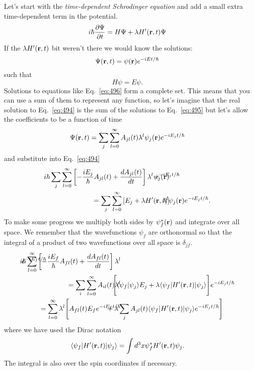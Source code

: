 Let's start with the {\em time-dependent Schrodinger equation} and add
a small extra time-dependent term in the potential.
\begin{equation}
i\hbar \frac{\partial {\Psi}}{\partial {t}} = H \Psi + \lambda H'({\bf r},t) \Psi
\label{eq:494}
\end{equation}
If the $\lambda H'({\bf r},t)$ bit weren't there we would know the solutions:
\begin{equation}
\Psi({\bf r}, t) = \psi({\bf r}) e^{-iEt/\hbar}
\label{eq:495}
\end{equation}
such that
\begin{equation}
H\psi = E \psi.
\label{eq:496}
\end{equation}
Solutions to equations like Eq.~\ref{eq:496} form a complete set.  This means
that you can use a sum of them to represent any function, so let's
imagine that the real solution to Eq.~\ref{eq:494} is the sum of the solutions
to Eq.~\ref{eq:495} but let's allow the coefficients to be a function of time
\begin{equation}
\Psi({\bf r}, t) = \sum_j \sum_{l=0}^\infty A_{jl}(t) \lambda^l \psi_j({\bf r}) e^{-iE_j t/\hbar}
\label{eq:497}
\end{equation}
and substitute into Eq.~\ref{eq:494}
\begin{eqnarray}
i\hbar \sum_j \sum_{l=0}^\infty 
\left [
 -\frac{i E_j}{\hbar} A_{jl}(t) + \dd{A_{jl}(t)}{t} \right ] 
\lambda^l  \psi_j({\bf r})  & \!\!\!\!\!\!\!\!\!\!\!\! e^{-iE_j t/\hbar}  \nonumber \\
= \sum_j \sum_{l=0}^\infty 
\left [ E_j + \lambda H'({\bf r},t) \right ] &\!\!\!\!\!\! \lambda^l  \psi_j({\bf r}) e^{-iE_j t/\hbar}.
\label{eq:498}
\end{eqnarray}
To make some progress we multiply both sides by $\psi^*_f({\bf r})$ and
integrate over all space.  We remember that the wavefunctions $\psi_f$
are orthonormal so that the integral of a product of two wavefunctions 
over all space is $\delta_{jf}$.
\begin{eqnarray}
  i\hbar \sum_{l=0}^\infty 
  \left [
    -\frac{i E_f}{\hbar} A_{fl}(t) + \dd{A_{fl}(t)}{t} \right ] 
  \lambda^l   & \hspace{-2in}e^{-iE_f t/\hbar}  \nonumber \\
  =\sum_{i} \sum_{l=0}^\infty A_{il}(t) \lambda^l 
&  \!\!\!\!\!\!\! \Biggr[ \langle \psi_f | \psi_j \rangle E_j + \lambda \langle\psi_f | H'({\bf r},t) |\psi_j \rangle
  \Biggr] e^{-iE_j t/\hbar} \\
  = \sum_{l=0}^\infty \lambda^l \Biggr  [ A_{fl}(t) E_f
  e^{-iE_f t/\hbar} 
  &\!\!\!\!\!\!\!\!\!\!\!\!\! + \lambda \sum_{j}  A_{jl}(t)  \langle\psi_f | H'({\bf r},t) |\psi_j \rangle
  e^{-iE_j t/\hbar} \Biggr ]
\label{eq:499}
\end{eqnarray}
where we have used the Dirac notation
\begin{equation}
\langle\psi_f | H'({\bf r},t) |\psi_j \rangle = \int d^3 x \psi_f^*
H'({\bf r},t) \psi_j .
\label{eq:500}
\end{equation}
The integral is also over the spin coordinates if necessary.

